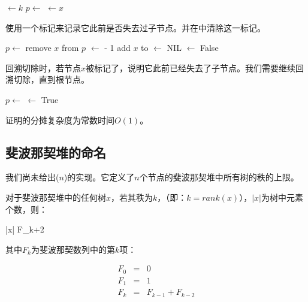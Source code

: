 \documentclass[b5paper]{ctexart}
\begin{document}
\begin{algorithmic}[1]
  \State {} $\gets k$
  \State $p \gets $ 
    \State {}
    \State {} 
  \EndIf
    \State {} $\gets x$
  \EndIf
\EndFunction
\end{algorithmic}

使用一个标记来记录它此前是否失去过子节点。并在中清除这一标记。

\begin{algorithmic}[1]
  \State $p \gets $ 
  \State remove $x$ from $p$
  \State {} $\gets$  - 1
  \State add $x$ to 
  \State {} $\gets$ NIL
  \State {} $\gets$ False
\EndFunction
\end{algorithmic}

回溯切除时，若节点$x$被标记了，说明它此前已经失去了子节点。我们需要继续回溯切除，直到根节点。

\begin{algorithmic}[1]
  \State $p \gets $ 
      \State {} $\gets$ True
    \Else
      \State {}
      \State {}
    \EndIf
  \EndIf
\EndFunction
\end{algorithmic}

\begin{Exercise}
证明的分摊复杂度为常数时间$O(1)$。
\end{Exercise}

\subsection{斐波那契堆的命名}

我们尚未给出($n$)的实现。它定义了$n$个节点的斐波那契堆中所有树的秩的上限。

\begin{lemma}
\label{lemma:Fib-degree}
对于斐波那契堆中的任何树$x$，若其秩为$k$，（即：$k = rank(x)$），$|x|$为树中元素个数，则：

\be
  |x| \geq F_{k+2}
\ee

其中$F_k$为斐波那契数列中的第$k$项：

\[
\begin{array}{rcl}
F_0 & = & 0 \\
F_1 & = & 1 \\
F_k & = & F_{k-1} + F_{k-2} \\
\end{array}
\]
\end{lemma}
\end{document}

